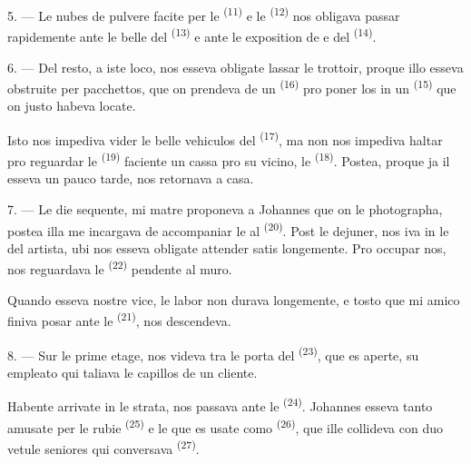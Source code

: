 5. --- Le nubes de pulvere facite per le 
\textsuperscript{(11)} e le  \textsuperscript{(12)}
nos obligava passar rapidemente ante le belle  del
 \textsuperscript{(13)} e ante le exposition de
 e  del 
\textsuperscript{(14)}.

6. --- Del resto, a iste loco, nos esseva obligate lassar le trottoir, proque illo
esseva obstruite per pacchettos, que on prendeva de un  \textsuperscript{(16)} pro poner los in un 
\textsuperscript{(15)} que on justo habeva locate.

Isto nos impediva vider le belle vehiculos del 
\textsuperscript{(17)}, ma non nos impediva haltar pro reguardar le
 \textsuperscript{(19)} faciente un cassa pro su vicino, le
 \textsuperscript{(18)}. Postea, proque
ja il esseva un pauco tarde, nos retornava a casa.

\VUsaut{3.0mm}

7. --- Le die sequente, mi matre proponeva a Johannes que on le photographa,
postea illa me incargava de accompaniar le al 
\textsuperscript{(20)}. Post le dejuner, nos iva in le  del
artista, ubi nos esseva obligate attender satis longemente. Pro occupar nos, nos
reguardava le  \textsuperscript{(22)} pendente al muro.

Quando esseva nostre vice, le labor non durava longemente, e tosto que mi amico
finiva posar ante le  \textsuperscript{(21)}, nos
descendeva.

8. --- Sur le prime etage, nos videva tra le porta del 
\textsuperscript{(23)}, que es aperte, su empleato qui taliava le capillos de un
cliente.

Habente arrivate in le strata, nos passava ante le 
\textsuperscript{(24)}. Johannes esseva tanto amusate per le rubie
 \textsuperscript{(25)} e le  que es usate
como  \textsuperscript{(26)}, que ille collideva con duo vetule
seniores qui conversava  \textsuperscript{(27)}.

